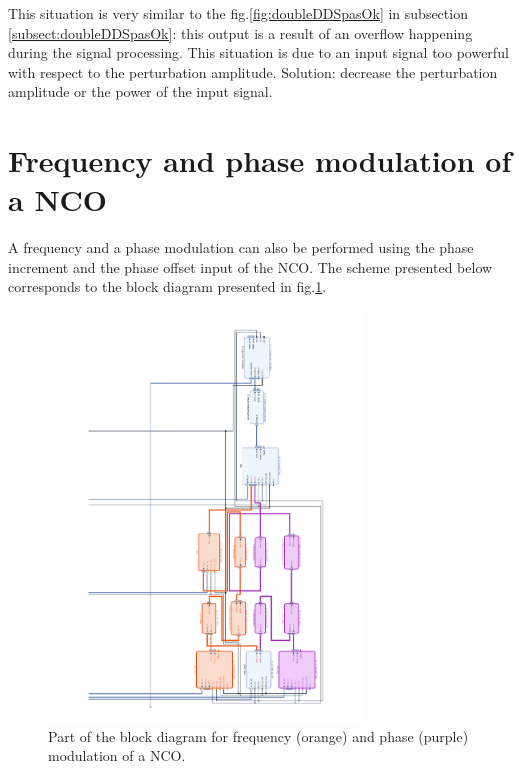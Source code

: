 \documentclass[12pt,oneside]{article}
\begin{document}
This situation is very similar to the fig.\ref{fig:doubleDDSpasOk} in subsection \ref{subsect:doubleDDSpasOk}: this output is a result of an overflow happening during the signal processing. This situation is due to an input signal too powerful with respect to the perturbation amplitude.
Solution: decrease the perturbation amplitude or the power of the input signal. 


\section{Frequency and phase modulation of a NCO}\label{sect:FMPM}

A frequency and a phase modulation can also be performed using the phase increment and the phase offset input of the NCO. The scheme presented below corresponds to the block diagram presented in fig.\ref{fig:mod_phase}.

\begin{figure}[h!tbp]
	\begin{center}
		\vspace{-3.5cm}
		\includegraphics[width=8.4cm,trim={10cm 1cm 2.5cm 0cm}, clip]{design/FMPM4.pdf}
		\caption{Part of the block diagram for frequency (orange) and phase (purple) modulation of a NCO.}
		\label{fig:mod_phase}
	\end{center}
\end{figure}
\end{document}

